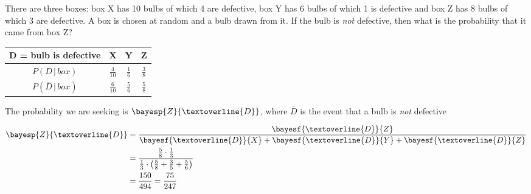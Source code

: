 

\question[3] There are three boxes: box X has 10 bulbs of which 4 are defective, 
box Y has 6 bulbs of which 1 is defective and box Z has 8 bulbs of which 3 are defective. 
A box is chosen at random and a bulb drawn from it. If the bulb is \textit{not} defective,
then what is the probability that it came from box Z?


\ifprintanswers
    \begin{tabular}{cccc}
      \toprule
      D = bulb is defective & X & Y & Z \\
      \midrule
      $P(D\,\vert\, box)$ & $\frac{4}{10}$ & $\frac{1}{6}$ & $\frac{3}{8}$ \\
      $P(\overline{D}\,\vert\, box)$ & $\frac{6}{10}$ & $\frac{5}{6}$ & $\frac{5}{8}$ \\
      \bottomrule
    \end{tabular}
\fi 

\begin{solution}[\fullpage]
   The probability we are seeking is $\bayesp{Z}{\textoverline{D}}$, where $\overline{D}$ 
   is the event that a bulb is \textit{not} defective
   
   \begin{align}
      \bayesp{Z}{\textoverline{D}} &= \dfrac{\bayesf{\textoverline{D}}{Z}}
      {\bayesf{\textoverline{D}}{X} + \bayesf{\textoverline{D}}{Y} + \bayesf{\textoverline{D}}{Z}} \\
      &= \dfrac{\frac{5}{8}\cdot\frac{1}{3}}{\frac{1}{3}\cdot\left(\frac{5}{8} +
      \frac{3}{5} + \frac{5}{6}\right)} \\
      &= \dfrac{150}{494} = \dfrac{75}{247}
   \end{align}
   
\end{solution}
